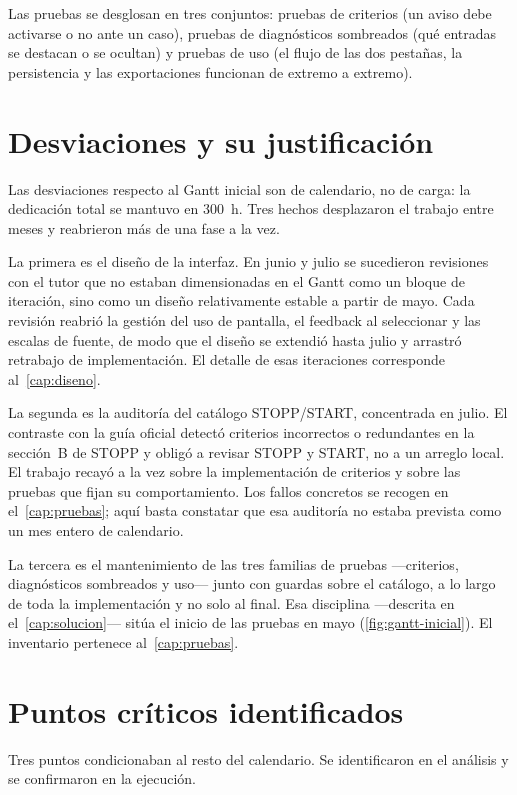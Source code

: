 Las pruebas se desglosan en tres conjuntos: pruebas de criterios (un
aviso debe activarse o no ante un caso), pruebas de diagnósticos
sombreados (qué entradas se destacan o se ocultan) y pruebas de uso
(el flujo de las dos pestañas, la persistencia y las exportaciones
funcionan de extremo a extremo).

\section{Desviaciones y su justificación}
\label{sec:desviaciones}

Las desviaciones respecto al Gantt inicial son de calendario, no de carga:
la dedicación total se mantuvo en 300~h. Tres hechos desplazaron el
trabajo entre meses y reabrieron más de una fase a la vez.

La primera es el diseño de la interfaz. En junio y julio se sucedieron
revisiones con el tutor que no estaban dimensionadas en el
Gantt como un bloque de iteración, sino como un diseño relativamente
estable a partir de mayo. Cada revisión reabrió la gestión del uso de
pantalla, el feedback al seleccionar y las escalas de fuente, de modo
que el diseño se extendió hasta julio y arrastró retrabajo de
implementación. El detalle de esas iteraciones corresponde
al~\cref{cap:diseno}.

La segunda es la auditoría del catálogo STOPP/START, concentrada en
julio. El contraste con la guía oficial detectó criterios incorrectos o
redundantes en la sección~B de STOPP y obligó a revisar STOPP y START, no
a un arreglo local. El trabajo recayó a la vez sobre la implementación de
criterios y sobre las pruebas que fijan su comportamiento. Los fallos
concretos se recogen en el~\cref{cap:pruebas}; aquí basta constatar que
esa auditoría no estaba prevista como un mes entero de calendario.

La tercera es el mantenimiento de las tres familias de pruebas ---criterios,
diagnósticos sombreados y uso--- junto con guardas sobre el catálogo, a lo
largo de toda la implementación y no solo al final. Esa disciplina
---descrita en el~\cref{cap:solucion}--- sitúa el inicio de las pruebas en
mayo (\cref{fig:gantt-inicial}). El inventario pertenece
al~\cref{cap:pruebas}.

\section{Puntos críticos identificados}
\label{sec:puntos-criticos}

Tres puntos condicionaban al resto del calendario. Se identificaron en el
análisis y se confirmaron en la ejecución.

